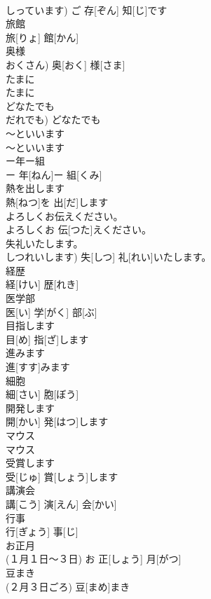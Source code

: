 \documentclass[8pt]{extreport}
\begin{document}
\begin{CJK}{UTF8}{min}
\\	しっています)	ご 存[ぞん] 知[じ]です		
\\	旅館	
\\	旅[りょ] 館[かん]		
\\	奥様	
\\	おくさん)	奥[おく] 様[さま]		
\\	たまに	
\\	たまに		
\\	どなたでも	
\\	だれでも)	どなたでも		
\\	～といいます	
\\	～といいます		
\\	ー年ー組	
\\	ー 年[ねん]ー 組[くみ]		
\\	熱を出します	
\\	熱[ねつ]を 出[だ]します		
\\	よろしくお伝えください。	
\\	よろしくお 伝[つた]えください。		
\\	失礼いたします。	
\\	しつれいします)	失[しつ] 礼[れい]いたします。		
\\	経歴	
\\	経[けい] 歴[れき]		
\\	医学部	
\\	医[い] 学[がく] 部[ぶ]		
\\	目指します	
\\	目[め] 指[ざ]します		
\\	進みます	
\\	進[すす]みます		
\\	細胞	
\\	細[さい] 胞[ぼう]		
\\	開発します	
\\	開[かい] 発[はつ]します		
\\	マウス	
\\	マウス		
\\	受賞します	
\\	受[じゅ] 賞[しょう]します		
\\	講演会	
\\	講[こう] 演[えん] 会[かい]		
\\	行事	
\\	行[ぎょう] 事[じ]		
\\	お正月	
\\	(１月１日～３日)	お 正[しょう] 月[がつ]		
\\	豆まき	
\\	(２月３日ごろ)	豆[まめ]まき		

\end{CJK}
\end{document}
